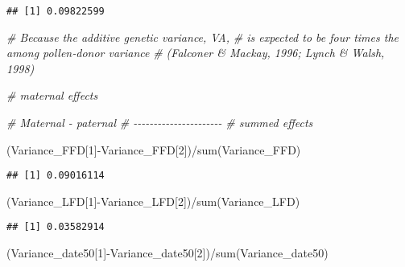 \documentclass[
]{article}
\newenvironment{Shaded}{\begin{snugshade}}{\end{snugshade}}
\newcommand{\CommentTok}[1]{\textcolor[rgb]{0.56,0.35,0.01}{\textit{#1}}}
\newcommand{\DecValTok}[1]{\textcolor[rgb]{0.00,0.00,0.81}{#1}}
\newcommand{\FunctionTok}[1]{\textcolor[rgb]{0.00,0.00,0.00}{#1}}
\newcommand{\NormalTok}[1]{#1}
\newcommand{\SpecialCharTok}[1]{\textcolor[rgb]{0.00,0.00,0.00}{#1}}
\begin{document}
\begin{verbatim}
## [1] 0.09822599
\end{verbatim}

\begin{Shaded}
\begin{Highlighting}[]
\CommentTok{\# Because the additive genetic variance, VA,}
\CommentTok{\# is expected to be four times the among pollen‐donor variance }
\CommentTok{\# (Falconer \& Mackay, 1996; Lynch \& Walsh, 1998)}
\end{Highlighting}
\end{Shaded}

\begin{Shaded}
\begin{Highlighting}[]
\CommentTok{\# maternal effects}

\CommentTok{\# Maternal {-} paternal}
\CommentTok{\# {-}{-}{-}{-}{-}{-}{-}{-}{-}{-}{-}{-}{-}{-}{-}{-}{-}{-}{-}{-}{-}{-}}
\CommentTok{\# summed effects}

\NormalTok{(Variance\_FFD[}\DecValTok{1}\NormalTok{]}\SpecialCharTok{{-}}\NormalTok{Variance\_FFD[}\DecValTok{2}\NormalTok{])}\SpecialCharTok{/}\FunctionTok{sum}\NormalTok{(Variance\_FFD)}
\end{Highlighting}
\end{Shaded}

\begin{verbatim}
## [1] 0.09016114
\end{verbatim}

\begin{Shaded}
\begin{Highlighting}[]
\NormalTok{(Variance\_LFD[}\DecValTok{1}\NormalTok{]}\SpecialCharTok{{-}}\NormalTok{Variance\_LFD[}\DecValTok{2}\NormalTok{])}\SpecialCharTok{/}\FunctionTok{sum}\NormalTok{(Variance\_LFD)}
\end{Highlighting}
\end{Shaded}

\begin{verbatim}
## [1] 0.03582914
\end{verbatim}

\begin{Shaded}
\begin{Highlighting}[]
\NormalTok{(Variance\_date50[}\DecValTok{1}\NormalTok{]}\SpecialCharTok{{-}}\NormalTok{Variance\_date50[}\DecValTok{2}\NormalTok{])}\SpecialCharTok{/}\FunctionTok{sum}\NormalTok{(Variance\_date50)}
\end{Highlighting}
\end{Shaded}
\end{document}

